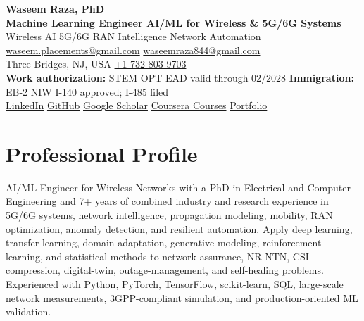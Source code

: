 \documentclass[9pt,letterpaper]{extarticle}
\begin{document}
\begin{center}
{\LARGE\bfseries Waseem Raza, PhD}{\normalsize\mdseries }\\[2pt]
{\large\bfseries Machine Learning Engineer \textbar{} AI/ML for Wireless \& 5G/6G Systems}\\[1pt]
{\small Wireless AI \textbar{} 5G/6G \textbar{} RAN Intelligence \textbar{} Network Automation}\\[3pt]
{\footnotesize {}\enspace \href{mailto:waseem.placements@gmail.com}{waseem.placements@gmail.com} \textbar{} \href{mailto:waseemraza844@gmail.com}{waseemraza844@gmail.com}\\[1pt]Three Bridges, NJ, USA \quad {}\enspace \href{tel:+17328039703}{+1 732-803-9703}\\[1pt]{\scriptsize \textbf{Work authorization:} STEM OPT EAD valid through 02/2028 \textbar{} \textbf{Immigration:} EB-2 NIW I-140 approved; I-485 filed}\\[1pt]\href{https://www.linkedin.com/in/waseem-raza-phd-9a737858/}{LinkedIn} \textbar{} \href{https://github.com/WaseemRaza844}{GitHub} \textbar{} \href{https://scholar.google.com/citations?user=d58Drr0AAAAJ\&hl=en}{Google Scholar} \textbar{} \href{https://waseemraza844.github.io/portfolio/learning.html}{Coursera Courses} \textbar{} \href{https://waseemraza844.github.io/portfolio/}{Portfolio}}
\end{center}
\vspace{-5pt}
\section{Professional Profile}
AI/ML Engineer for Wireless Networks with a PhD in Electrical and Computer Engineering and 7+ years of combined industry and research experience in 5G/6G systems, network intelligence, propagation modeling, mobility, RAN optimization, anomaly detection, and resilient automation. Apply deep learning, transfer learning, domain adaptation, generative modeling, reinforcement learning, and statistical methods to network-assurance, NR-NTN, CSI compression, digital-twin, outage-management, and self-healing problems. Experienced with Python, PyTorch, TensorFlow, scikit-learn, SQL, large-scale network measurements, 3GPP-compliant simulation, and production-oriented ML validation.
\end{document}
